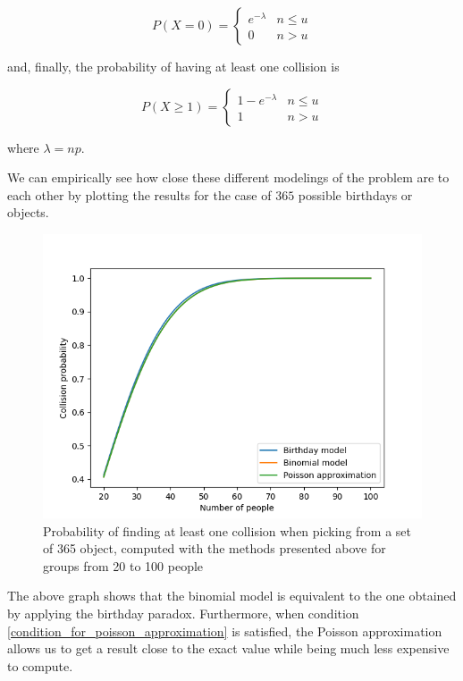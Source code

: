 \documentclass{report}
\begin{document}
\begin{equation}
		P(X=0)=
		\begin{cases}
			e^{-\lambda} & n \leq u \\
			0 & n > u
	\end{cases}
\end{equation}

and, finally, the probability of having at least one collision is

\begin{equation} \label{uuid_collision_poisson_approximation}
		P(X \geq 1)=
		\begin{cases}
				1-e^{-\lambda} & n \leq u \\
				1 & n > u
		\end{cases}
\end{equation}

where $\lambda=np$.\newline

We can empirically see how close these different modelings of the problem are to each other by plotting the results for the case of $365$ possible birthdays or objects.

\begin{figure}[H]
		\includegraphics[scale=0.5]{Exact probability vs approximations}
		\caption{Probability of finding at least one collision when picking from a set of 365 object, computed with the methods presented above for groups from 20 to 100 people}
\end{figure}
\noindent
The above graph shows that the binomial model is equivalent to the one obtained by applying the birthday paradox. Furthermore, when condition \ref{condition_for_poisson_approximation} is satisfied, the
Poisson approximation allows us to get a result close to the exact value while being much less expensive to compute.
\end{document}
